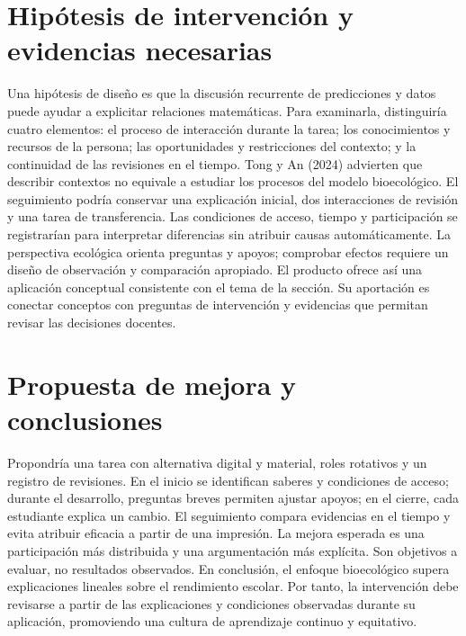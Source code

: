 \documentclass[spanish,letterpaper,oneside]{article}
\begin{document}
\section{Hipótesis de intervención y evidencias necesarias}
Una hipótesis de diseño es que la discusión recurrente de predicciones y datos puede ayudar a explicitar relaciones matemáticas. Para examinarla, distinguiría cuatro elementos: el proceso de interacción durante la tarea; los conocimientos y recursos de la persona; las oportunidades y restricciones del contexto; y la continuidad de las revisiones en el tiempo. Tong y An (2024) advierten que describir contextos no equivale a estudiar los procesos del modelo bioecológico.
El seguimiento podría conservar una explicación inicial, dos interacciones de revisión y una tarea de transferencia. Las condiciones de acceso, tiempo y participación se registrarían para interpretar diferencias sin atribuir causas automáticamente. La perspectiva ecológica orienta preguntas y apoyos; comprobar efectos requiere un diseño de observación y comparación apropiado.
El producto ofrece así una aplicación conceptual consistente con el tema de la sección. Su aportación es conectar conceptos con preguntas de intervención y evidencias que permitan revisar las decisiones docentes.

\section{Propuesta de mejora y conclusiones}
Propondría una tarea con alternativa digital y material, roles rotativos y un registro de revisiones. En el inicio se identifican saberes y condiciones de acceso; durante el desarrollo, preguntas breves permiten ajustar apoyos; en el cierre, cada estudiante explica un cambio. El seguimiento compara evidencias en el tiempo y evita atribuir eficacia a partir de una impresión.
La mejora esperada es una participación más distribuida y una argumentación más explícita. Son objetivos a evaluar, no resultados observados. En conclusión, el enfoque bioecológico supera explicaciones lineales sobre el rendimiento escolar. Por tanto, la intervención debe revisarse a partir de las explicaciones y condiciones observadas durante su aplicación, promoviendo una cultura de aprendizaje continuo y equitativo.
\end{document}
